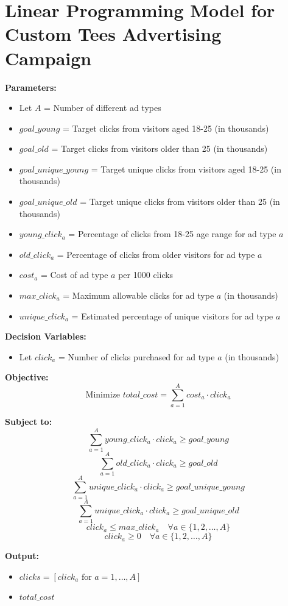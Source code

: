 \documentclass{article}
\begin{document}
\section*{Linear Programming Model for Custom Tees Advertising Campaign}

\textbf{Parameters:}

\begin{itemize}
    \item Let $A$ = Number of different ad types
    \item $goal\_young$ = Target clicks from visitors aged 18-25 (in thousands)
    \item $goal\_old$ = Target clicks from visitors older than 25 (in thousands)
    \item $goal\_unique\_young$ = Target unique clicks from visitors aged 18-25 (in thousands)
    \item $goal\_unique\_old$ = Target unique clicks from visitors older than 25 (in thousands)
    \item $young\_click_a$ = Percentage of clicks from 18-25 age range for ad type $a$
    \item $old\_click_a$ = Percentage of clicks from older visitors for ad type $a$
    \item $cost_a$ = Cost of ad type $a$ per 1000 clicks
    \item $max\_click_a$ = Maximum allowable clicks for ad type $a$ (in thousands)
    \item $unique\_click_a$ = Estimated percentage of unique visitors for ad type $a$
\end{itemize}

\textbf{Decision Variables:}
\begin{itemize}
    \item Let $click_a$ = Number of clicks purchased for ad type $a$ (in thousands)
\end{itemize}

\textbf{Objective:}
\[
\text{Minimize } total\_cost = \sum_{a=1}^{A} cost_a \cdot click_a
\]

\textbf{Subject to:}
\[
\sum_{a=1}^{A} young\_click_a \cdot click_a \geq goal\_young
\]
\[
\sum_{a=1}^{A} old\_click_a \cdot click_a \geq goal\_old
\]
\[
\sum_{a=1}^{A} unique\_click_a \cdot click_a \geq goal\_unique\_young
\]
\[
\sum_{a=1}^{A} unique\_click_a \cdot click_a \geq goal\_unique\_old
\]
\[
click_a \leq max\_click_a \quad \forall a \in \{1, 2, \ldots, A\}
\]
\[
click_a \geq 0 \quad \forall a \in \{1, 2, \ldots, A\}
\]

\textbf{Output:}
\begin{itemize}
    \item $clicks = [click_a \text{ for } a = 1, \ldots, A]$
    \item $total\_cost$
\end{itemize}
\end{document}
